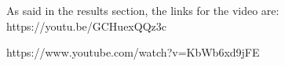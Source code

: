 As said in the results section, the links for the video are:
https://youtu.be/GCHuexQQz3c

https://www.youtube.com/watch?v=KbWb6xd9jFE
